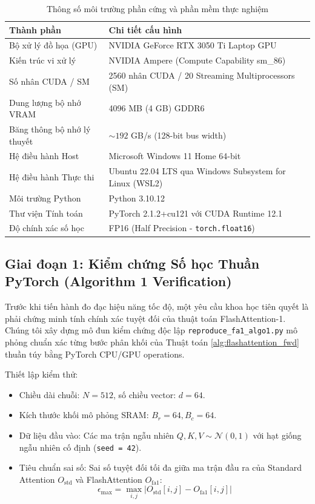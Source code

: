 \documentclass[10pt,a4paper]{article}
\begin{document}
\begin{table}[htbp]
\centering
\caption{Thông số môi trường phần cứng và phần mềm thực nghiệm}
\label{tab:hardware_specs}
\begin{tabular}{ll}
\toprule
\textbf{Thành phần} & \textbf{Chi tiết cấu hình} \\
\midrule
Bộ xử lý đồ họa (GPU) & NVIDIA GeForce RTX 3050 Ti Laptop GPU \\
Kiến trúc vi xử lý & NVIDIA Ampere (Compute Capability sm\_86) \\
Số nhân CUDA / SM & 2560 nhân CUDA / 20 Streaming Multiprocessors (SM) \\
Dung lượng bộ nhớ VRAM & 4096 MB (4 GB) GDDR6 \\
Băng thông bộ nhớ lý thuyết & $\sim 192$ GB/s (128-bit bus width) \\
Hệ điều hành Host & Microsoft Windows 11 Home 64-bit \\
Hệ điều hành Thực thi & Ubuntu 22.04 LTS qua Windows Subsystem for Linux (WSL2) \\
Môi trường Python & Python 3.10.12 \\
Thư viện Tính toán & PyTorch 2.1.2+cu121 với CUDA Runtime 12.1 \\
Độ chính xác số học & FP16 (Half Precision - \texttt{torch.float16}) \\
\bottomrule
\end{tabular}
\end{table}

\subsection{Giai đoạn 1: Kiểm chứng Số học Thuần PyTorch (Algorithm 1 Verification)}
Trước khi tiến hành đo đạc hiệu năng tốc độ, một yêu cầu khoa học tiên quyết là phải chứng minh tính chính xác tuyệt đối của thuật toán FlashAttention-1. Chúng tôi xây dựng mô đun kiểm chứng độc lập \texttt{reproduce\_fa1\_algo1.py} mô phỏng chuẩn xác từng bước phân khối của Thuật toán \ref{alg:flashattention_fwd} thuần túy bằng PyTorch CPU/GPU operations.

Thiết lập kiểm thử:
\begin{itemize}
    \item Chiều dài chuỗi: $N = 512$, số chiều vector: $d = 64$.
    \item Kích thước khối mô phỏng SRAM: $B_r = 64, B_c = 64$.
    \item Dữ liệu đầu vào: Các ma trận ngẫu nhiên $Q, K, V \sim \mathcal{N}(0, 1)$ với hạt giống ngẫu nhiên cố định (\texttt{seed = 42}).
    \item Tiêu chuẩn sai số: Sai số tuyệt đối tối đa giữa ma trận đầu ra của Standard Attention $O_{\text{std}}$ và FlashAttention $O_{\text{fa1}}$:
    \begin{equation}
    \epsilon_{\max} = \max_{i, j} |O_{\text{std}}[i, j] - O_{\text{fa1}}[i, j]|
    \end{equation}
\end{itemize}
\end{document}
